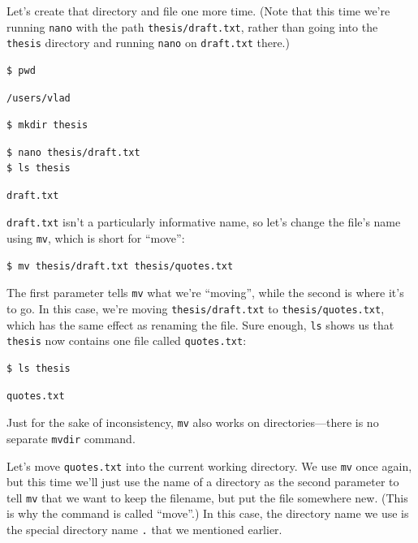 \documentclass[]{book}
\begin{document}
Let's create that directory and file one more time. (Note that this time
we're running \texttt{nano} with the path \texttt{thesis/draft.txt},
rather than going into the \texttt{thesis} directory and running
\texttt{nano} on \texttt{draft.txt} there.)

\begin{verbatim}
$ pwd
\end{verbatim}

\begin{verbatim}
/users/vlad
\end{verbatim}

\begin{verbatim}
$ mkdir thesis
\end{verbatim}

\begin{verbatim}
$ nano thesis/draft.txt
$ ls thesis
\end{verbatim}

\begin{verbatim}
draft.txt
\end{verbatim}

\texttt{draft.txt} isn't a particularly informative name, so let's
change the file's name using \texttt{mv}, which is short for ``move'':

\begin{verbatim}
$ mv thesis/draft.txt thesis/quotes.txt
\end{verbatim}

The first parameter tells \texttt{mv} what we're ``moving'', while the
second is where it's to go. In this case, we're moving
\texttt{thesis/draft.txt} to \texttt{thesis/quotes.txt}, which has the
same effect as renaming the file. Sure enough, \texttt{ls} shows us that
\texttt{thesis} now contains one file called \texttt{quotes.txt}:

\begin{verbatim}
$ ls thesis
\end{verbatim}

\begin{verbatim}
quotes.txt
\end{verbatim}

Just for the sake of inconsistency, \texttt{mv} also works on
directories---there is no separate \texttt{mvdir} command.

Let's move \texttt{quotes.txt} into the current working directory. We
use \texttt{mv} once again, but this time we'll just use the name of a
directory as the second parameter to tell \texttt{mv} that we want to
keep the filename, but put the file somewhere new. (This is why the
command is called ``move''.) In this case, the directory name we use is
the special directory name \texttt{.} that we mentioned earlier.
\end{document}
